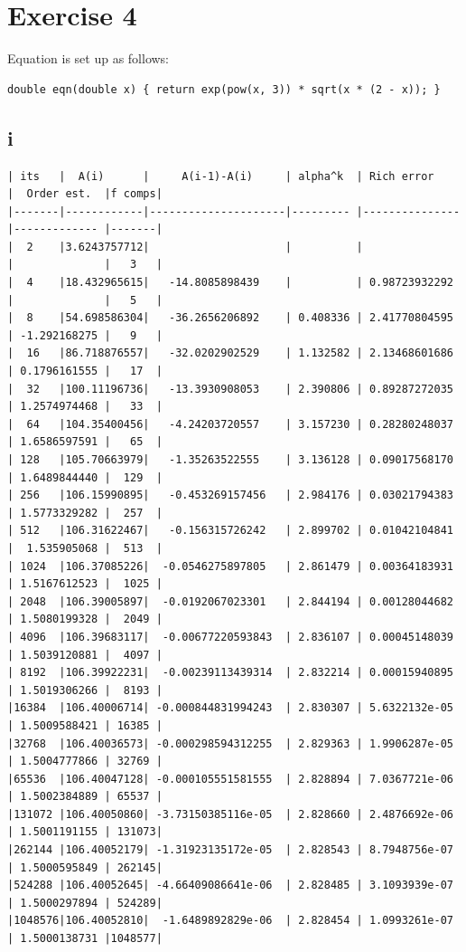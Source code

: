 \documentclass{article}
\begin{document}
\newpage
\section*{Exercise 4}

Equation is set up as follows:
\begin{verbatim}
double eqn(double x) { return exp(pow(x, 3)) * sqrt(x * (2 - x)); }
\end{verbatim}

\subsection*{i}
\begin{verbatim}
| its   |  A(i)      |     A(i-1)-A(i)     | alpha^k  | Rich error    |  Order est.  |f comps|
|-------|------------|---------------------|--------- |---------------|------------- |-------|
|  2    |3.6243757712|                     |          |               |              |   3   |
|  4    |18.432965615|   -14.8085898439    |          | 0.98723932292 |              |   5   |
|  8    |54.698586304|   -36.2656206892    | 0.408336 | 2.41770804595 | -1.292168275 |   9   |
|  16   |86.718876557|   -32.0202902529    | 1.132582 | 2.13468601686 | 0.1796161555 |   17  |
|  32   |100.11196736|   -13.3930908053    | 2.390806 | 0.89287272035 | 1.2574974468 |   33  |
|  64   |104.35400456|   -4.24203720557    | 3.157230 | 0.28280248037 | 1.6586597591 |   65  |
| 128   |105.70663979|   -1.35263522555    | 3.136128 | 0.09017568170 | 1.6489844440 |  129  |
| 256   |106.15990895|   -0.453269157456   | 2.984176 | 0.03021794383 | 1.5773329282 |  257  |
| 512   |106.31622467|   -0.156315726242   | 2.899702 | 0.01042104841 |  1.535905068 |  513  |
| 1024  |106.37085226|  -0.0546275897805   | 2.861479 | 0.00364183931 | 1.5167612523 |  1025 |
| 2048  |106.39005897|  -0.0192067023301   | 2.844194 | 0.00128044682 | 1.5080199328 |  2049 |
| 4096  |106.39683117|  -0.00677220593843  | 2.836107 | 0.00045148039 | 1.5039120881 |  4097 |
| 8192  |106.39922231|  -0.00239113439314  | 2.832214 | 0.00015940895 | 1.5019306266 |  8193 |
|16384  |106.40006714| -0.000844831994243  | 2.830307 | 5.6322132e-05 | 1.5009588421 | 16385 |
|32768  |106.40036573| -0.000298594312255  | 2.829363 | 1.9906287e-05 | 1.5004777866 | 32769 |
|65536  |106.40047128| -0.000105551581555  | 2.828894 | 7.0367721e-06 | 1.5002384889 | 65537 |
|131072 |106.40050860| -3.73150385116e-05  | 2.828660 | 2.4876692e-06 | 1.5001191155 | 131073|
|262144 |106.40052179| -1.31923135172e-05  | 2.828543 | 8.7948756e-07 | 1.5000595849 | 262145|
|524288 |106.40052645| -4.66409086641e-06  | 2.828485 | 3.1093939e-07 | 1.5000297894 | 524289|
|1048576|106.40052810|  -1.6489892829e-06  | 2.828454 | 1.0993261e-07 | 1.5000138731 |1048577|
\end{verbatim}
\end{document}
